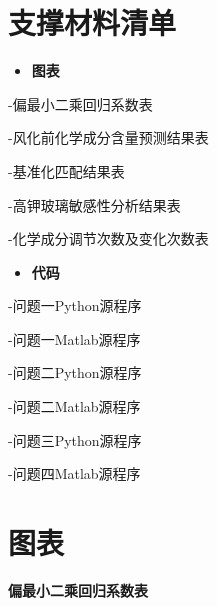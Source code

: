 \documentclass[withoutpreface,bwprint]{cumcmthesis} %
\begin{document}
\newpage
\begin{appendices}
\section{支撑材料清单}

\begin{itemize}
	\item \textbf{图表}
 \end{itemize}
 

-偏最小二乘回归系数表

-风化前化学成分含量预测结果表

-基准化匹配结果表

-高钾玻璃敏感性分析结果表

-化学成分调节次数及变化次数表


\begin{itemize}
	\item \textbf{代码}
 \end{itemize}
 
-问题一Python源程序

-问题一Matlab源程序

-问题二Python源程序

-问题二Matlab源程序

-问题三Python源程序

-问题四Matlab源程序

\newpage
\section{图表}

\textbf{偏最小二乘回归系数表}


\end{appendices}
\end{document}
